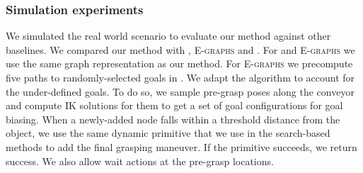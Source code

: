 \documentclass[a4paper]{report}
\begin{document}

\subsubsection{Simulation experiments}






We simulated the real world scenario to evaluate our method against other baselines. We compared our method with \wastar, \textsc{E-graphs} and \rrt. 
For \wastar and \textsc{E-graphs} we use the same graph representation as our method. 
For \textsc{E-graphs} we precompute five paths to randomly-selected  goals in \Gfull. 
We adapt the \rrt algorithm to account for the under-defined goals. To do so, we sample pre-grasp poses along the conveyor 
and compute IK solutions for them to get a set of goal configurations for goal biasing. 
When a newly-added node falls within a threshold distance from the object, we use the same dynamic primitive that we use in the search-based methods to add the final grasping maneuver. If the primitive succeeds, we return success. We also allow wait actions at the pre-grasp locations.
\end{document}
